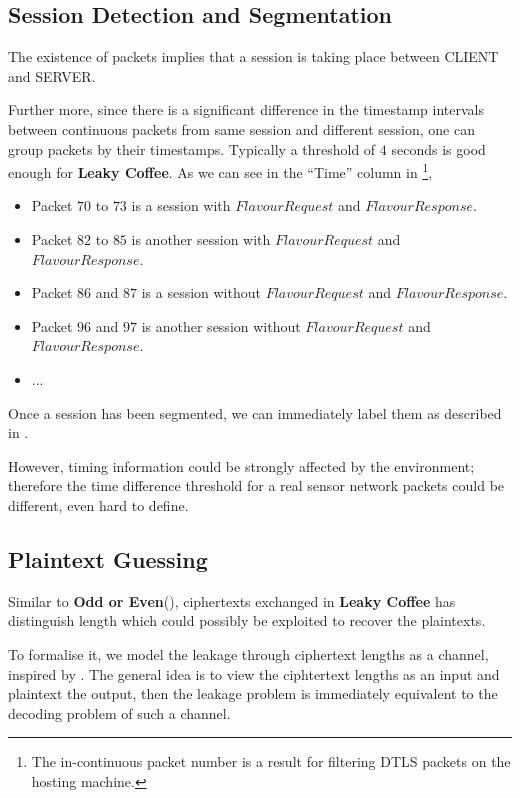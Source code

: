 \subsection{Session Detection and Segmentation}
The existence of packets implies that a session is taking place between CLIENT and SERVER.

Further more, since there is a significant difference in the timestamp intervals between continuous packets from same session and different session, one can group packets by their timestamps. Typically a threshold of $4$ seconds is good enough for \textbf{Leaky Coffee}. As we can see in the “Time” column in \footnote{The in-continuous packet number is a result for filtering DTLS packets on the hosting machine.},
\begin{itemize}
\item Packet $70$ to $73$ is a session with $FlavourRequest$ and $FlavourResponse$.
\item Packet $82$ to $85$ is another session with $FlavourRequest$ and $FlavourResponse$.
\item Packet $86$ and $87$ is a session without $FlavourRequest$ and $FlavourResponse$.
\item Packet $96$ and $97$ is another session without $FlavourRequest$ and $FlavourResponse$.
\item ...
\end{itemize}

Once a session has been segmented, we can immediately label them as described in .

However,  timing information could be strongly affected by the environment; therefore the time difference threshold for a real sensor network packets could be different, even hard to define.

\subsection{Plaintext Guessing} \label{Sec: Plaintext Guessing}
Similar to \textbf{Odd or Even}(), ciphertexts exchanged in \textbf{Leaky Coffee} has distinguish length which could possibly be exploited to recover the plaintexts.

To formalise it, we model the leakage through ciphertext lengths as a channel\cite{Information_Theory}, inspired by \cite{Web2}. The general idea is to view the ciphtertext lengths as an input and plaintext the output, then the leakage problem is immediately equivalent  to the decoding problem of such a channel. 

